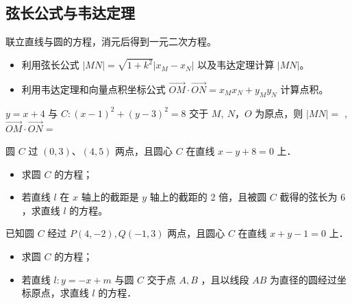 \vspace{4em}

\subsection{弦长公式与韦达定理}
\begin{theorem}[弦长公式与韦达定理]
    联立直线与圆的方程，消元后得到一元二次方程。
    \begin{itemize}
        \item 利用弦长公式 $|MN| = \sqrt{1+k^2}|x_M-x_N|$ 以及韦达定理计算 $|MN|$。
        \item 利用韦达定理和向量点积坐标公式 $\overrightarrow{OM} \cdot \overrightarrow{ON} = x_M x_N + y_M y_N$ 计算点积。
    \end{itemize}
\end{theorem}
\begin{example}
    $y=x+4$ 与 $C:(x-1)^2+(y-3)^2=8$ 交于 $M, ~ N$，$O$ 为原点，则 $|M N|=$ \underline{\qquad} , $\overrightarrow{O M} \cdot \overrightarrow{O N}=$ \underline{\qquad}
\end{example}

\vspace{4em}

\begin{example}
    圆 $C$ 过 $(0,3) 、(4,5)$ 两点，且圆心 $C$ 在直线 $x-y+8=0$ 上．
    \begin{itemize}
        \item[（1）] 求圆 $C$ 的方程；
        \item[（2）] 若直线 $l$ 在 $x$ 轴上的截距是 $y$ 轴上的截距的 2 倍，且被圆 $C$ 截得的弦长为 6 ，求直线 $l$ 的方程。
    \end{itemize}
\end{example}

\vspace{4em}

\begin{example}
    已知圆 $C$ 经过 $P(4,-2), Q(-1,3)$ 两点，且圆心 $C$ 在直线 $x+y-1=0$ 上．
    \begin{itemize}
        \item[（1）] 求圆 $C$ 的方程；
        \item[（2）] 若直线 $l: y=-x+m$ 与圆 $C$ 交于点 $A, B$ ，且以线段 $A B$ 为直径的圆经过坐标原点，求直线 $l$ 的方程．
    \end{itemize}
\end{example}

\vspace{4em}

